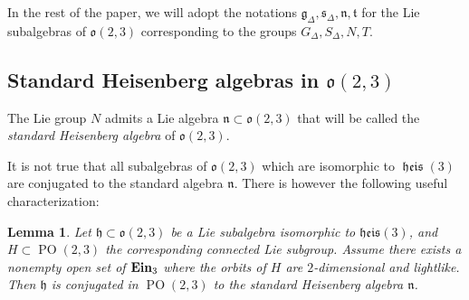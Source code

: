 \documentclass[11pt]{article}
\newtheorem{lemm}[theo]{Lemma}
\theoremstyle{definition}
\numberwithin{equation}{section}
\numberwithin{figure}{section}
\numberwithin{table}{section}
\DeclareMathOperator{\ein}{{\bf Ein}_3}
\DeclareMathOperator{\heis}{{\mathfrak{heis}}}
\newcommand{\lien}{{\mathfrak{n}}}
\newcommand{\lieg}{{\mathfrak{g}}}
\newcommand{\lieh}{{\mathfrak{h}}}
\newcommand{\lies}{{\mathfrak{s}}}
\newcommand{\oo}{{\mathfrak{o}}}
\DeclareMathOperator{\POop}{PO}
\newcommand{\PO}{{\POop(2,3)}}
\begin{document}
In the rest of the paper, we will adopt the notations $\lieg_{\Delta}, \lies_{\Delta}, \lien, \mathfrak{t}$ for the Lie subalgebras of $\oo(2,3)$ corresponding to the groups $G_{\Delta}, S_{\Delta}, N, T$.


\subsection{Standard Heisenberg algebras in \texorpdfstring{$\oo(2,3)$}{oo(2,3)}}\label{sec.standard}

The Lie group $N$ admits a Lie algebra $\lien \subset \oo(2,3)$ that will be called the \emph{standard Heisenberg algebra} of $\oo(2,3)$.

It is not true that all subalgebras of $\oo(2,3)$ which are isomorphic to $\heis(3)$ are conjugated to the standard algebra $\lien$. There is however the following useful characterization:

\begin{lemm}\label{lem.standard}
Let $\lieh \subset \oo(2,3)$ be a Lie subalgebra isomorphic to $\mathfrak{heis}(3)$, and $H \subset \PO$ the corresponding connected Lie subgroup. Assume there exists a nonempty open set of $\ein$ where the orbits of $H$ are $2$-dimensional and lightlike. Then $\lieh$ is conjugated in $\PO$ to the standard Heisenberg algebra $\lien$.
\end{lemm}
\end{document}
